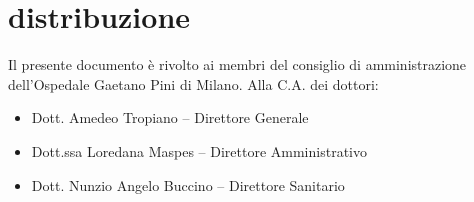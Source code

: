 %
%
\section[Distribuzione]{distribuzione}
\label{abs-distribution}
Il presente documento è rivolto ai membri del consiglio di amministrazione dell'Ospedale Gaetano Pini di Milano. Alla C.A. dei dottori:

\begin{itemize}
\item{Dott. Amedeo Tropiano -- Direttore Generale}
\item{Dott.ssa Loredana Maspes -- Direttore Amministrativo}
\item{Dott. Nunzio Angelo Buccino -- Direttore Sanitario}
\end{itemize}